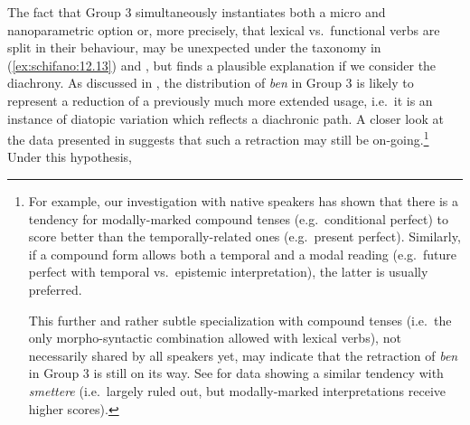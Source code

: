 \documentclass[output=paper]{langsci/langscibook}
\begin{document}
The fact that Group 3 simultaneously instantiates both a micro and
nanoparametric option or, more precisely, that lexical vs.\ functional verbs are
split in their behaviour, may be unexpected under the taxonomy in (\ref{ex:schifano:12.13}) and ,
but finds a plausible explanation if we consider the diachrony. As discussed in
, the distribution of \emph{ben} in Group 3 is likely to represent a
reduction of a previously much more extended usage, i.e.\ it is an instance of
diatopic variation which reflects a diachronic path. A closer look at the data
presented in \textcite{CognSchi2018b,CognSchi2018} suggests that such a
retraction may still be on-going.\footnote{For example, our investigation with
    native speakers has shown that there is a tendency for modally-marked
    compound tenses (e.g.\ conditional perfect) to score better than the
    temporally-related ones (e.g.\ present perfect).
%
%
%
Similarly, if a compound form allows both a temporal and a modal reading (e.g.\
future perfect with temporal vs.\ epistemic interpretation), the
latter is usually preferred.

%

This further and rather subtle specialization with compound tenses (i.e.\ the
only morpho-syntactic combination allowed with lexical verbs), not necessarily
shared by all speakers yet, may indicate that the retraction of \emph{ben} in
Group 3 is still on its way. See \citet{CognSchi2015} for data showing a
similar tendency with \emph{smettere} (i.e.\ largely ruled out, but
modally-marked interpretations receive higher scores).} Under this hypothesis,
\end{document}
